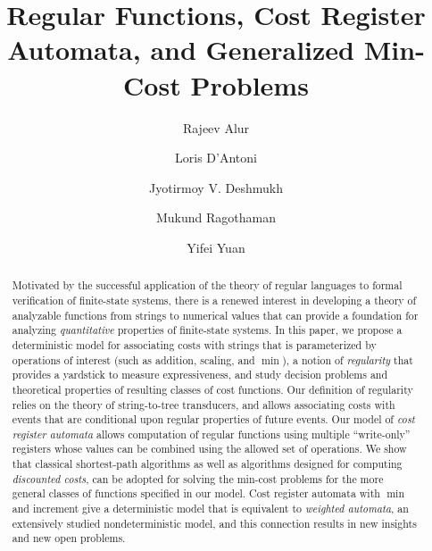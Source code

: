 \documentclass[11pt]{article}
\begin{document}
\thispagestyle{empty}
\begin{titlepage}

\title{Regular Functions, Cost Register Automata, and Generalized Min-Cost Problems}

\author{
Rajeev Alur \and
Loris D'Antoni \and
Jyotirmoy V. Deshmukh \and
Mukund Ragothaman \and
Yifei Yuan
}



\maketitle
\thispagestyle{empty}

\begin{abstract}
Motivated by the successful application of the theory of regular
languages to formal verification of finite-state systems, there is a
renewed interest in developing a theory of analyzable functions from
strings to numerical values that can provide a foundation for
analyzing {\em quantitative\/} properties of finite-state systems.  In
this paper, we propose a deterministic model for associating costs
with strings that is parameterized by operations of interest (such as
addition, scaling, and $\min$), a notion of {\em regularity\/} that
provides a yardstick to measure expressiveness, and study decision
problems and theoretical properties of resulting classes of cost
functions.  Our definition of regularity relies on the theory of
string-to-tree transducers, and allows associating costs with events
that are conditional upon regular properties of future events.  Our
model of {\em cost register automata\/} allows computation of regular
functions using multiple ``write-only'' registers whose values can be
combined using the allowed set of operations.  We show that classical
shortest-path algorithms as well as algorithms designed for computing
{\em discounted costs\/}, can be adopted for solving the min-cost
problems for the more general classes of functions specified in our
model.  Cost register automata with $\min$ and increment give a
deterministic model that is equivalent to {\em weighted automata\/},
an extensively studied nondeterministic model, and this connection
results in new insights and new open problems.
\end{abstract}

\end{titlepage}
\end{document}
